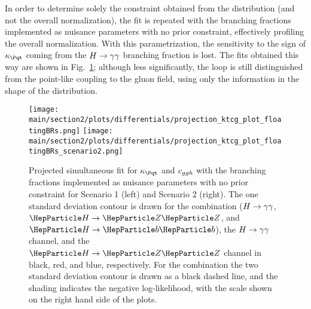 In order to determine solely the constraint obtained from the distribution (and not the overall normalization), the fit is repeated with the branching fractions implemented as nuisance parameters with no prior constraint, effectively profiling the overall normalization.
% 
With this parametrization, the sensitivity to the sign of $\kappat$ coming from the $H\rightarrow\gamma\gamma$ branching fraction is lost.
% 
The fits obtained this way are shown in Fig.~\ref{fig:ktcg_floatingBRs}; although less significantly, the loop is still distinguished from the point-like coupling to the gluon field, using only the information in the shape of the distribution.

\begin{figure}[hbtp]
  \begin{center}
    \texttt{[image: \\main/section2/plots/differentials/projection\_ktcg\_plot\_floatingBRs.png]}
    \texttt{[image: \\main/section2/plots/differentials/projection\_ktcg\_plot\_floatingBRs\_scenario2.png]}
    \caption{
        Projected simultaneous fit for $\kappat$ and $c_{ggh}$ with the branching fractions implemented as nuisance parameters with no prior constraint for Scenario 1 (left) and Scenario 2 (right).
        The one standard deviation contour is drawn for the combination ($H\rightarrow\gamma\gamma$, $\hzz$, and $\hbb$), the $H\rightarrow\gamma\gamma$ channel, and the $\hzz$ channel in black, red, and blue, respectively.
        For the combination the two standard deviation contour is drawn as a black dashed line, and the shading indicates the negative log-likelihood, with the scale shown on the right hand side of the plots.
        }
    \label{fig:ktcg_floatingBRs}
  \end{center}
\end{figure}




